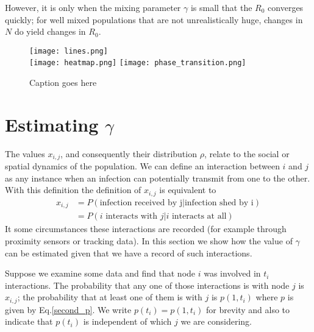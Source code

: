 \documentclass[10pt]{article}
\begin{document}
\begin{multicols}{2}
However, it is only when the mixing parameter $\gamma$ is small that the $R_{0}$ converges quickly; for well mixed populations that are not unrealistically huge, changes in $N$ do yield changes in $R_{0}$. 

\begin{figure}[H]
\texttt{[image: lines.png]}\\
\texttt{[image: heatmap.png]}
\texttt{[image: phase\_transition.png]}
\caption{Caption goes here}
\end{figure}

\section*{Estimating $\gamma$}
The values $x_{i,j}$, and consequently their distribution $\rho$, relate to the social or spatial dynamics of the population. We can define an interaction between $i$ and $j$ as any instance when an infection can potentially transmit from one to the other. With this definition the definition of $x_{i,j}$ is equivalent to
\begin{equation}
\begin{split}
x_{i,j}&=P(\text{infection received by j}|\text{infection shed by i})\\
&=P(i\text{ interacts with }j|i\text{ interacts at all})
\end{split}
\end{equation}
It some circumstances these interactions are recorded (for example through proximity sensors or tracking data). In this section we show how the value of $\gamma$ can be estimated given that we have a record of such interactions.

Suppose we examine some data and find that node $i$ was involved in $t_{i}$ interactions. The probability that any one of those interactions is with node $j$ is $x_{i,j}$; the probability that at least one of them is with $j$ is $p(1,t_{i})$ where $p$ is given by Eq.\eqref{second_p}. We write $p(t_{i})=p(1,t_{i})$ for brevity and also to indicate that $p(t_{i})$ is independent of which $j$ we are considering. 


\end{multicols}
\end{document}
